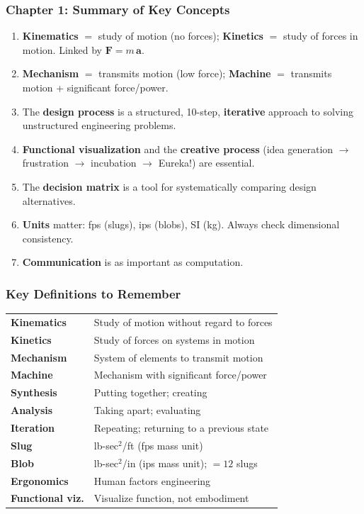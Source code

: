 \documentclass[10pt,aspectratio=43]{beamer}
\begin{document}

\begin{frame}
\frametitle{Chapter 1: Summary of Key Concepts}

\begin{enumerate}
  \item \textbf{Kinematics} $=$ study of motion (no forces); \textbf{Kinetics} $=$ study of forces in motion. Linked by $\mathbf{F} = m\,\mathbf{a}$.
  \item \textbf{Mechanism} $=$ transmits motion (low force); \textbf{Machine} $=$ transmits motion + significant force/power.
  \item The \textbf{design process} is a structured, 10-step, \textbf{iterative} approach to solving unstructured engineering problems.
  \item \textbf{Functional visualization} and the \textbf{creative process} (idea generation $\to$ frustration $\to$ incubation $\to$ Eureka!) are essential.
  \item The \textbf{decision matrix} is a tool for systematically comparing design alternatives.
  \item \textbf{Units} matter: fps (slugs), ips (blobs), SI (kg). Always check dimensional consistency.
  \item \textbf{Communication} is as important as computation.
\end{enumerate}

\end{frame}

\begin{frame}
\frametitle{Key Definitions to Remember}

\begin{yellowbox}
\begin{tabular}{@{}ll@{}}
\textbf{Kinematics} & Study of motion without regard to forces \\
\textbf{Kinetics} & Study of forces on systems in motion \\
\textbf{Mechanism} & System of elements to transmit motion \\
\textbf{Machine} & Mechanism with significant force/power \\
\textbf{Synthesis} & Putting together; creating \\
\textbf{Analysis} & Taking apart; evaluating \\
\textbf{Iteration} & Repeating; returning to a previous state \\
\textbf{Slug} & lb-sec$^2$/ft (fps mass unit) \\
\textbf{Blob} & lb-sec$^2$/in (ips mass unit); $= 12$ slugs \\
\textbf{Ergonomics} & Human factors engineering \\
\textbf{Functional viz.} & Visualize function, not embodiment \\
\end{tabular}
\end{yellowbox}

\end{frame}
\end{document}
